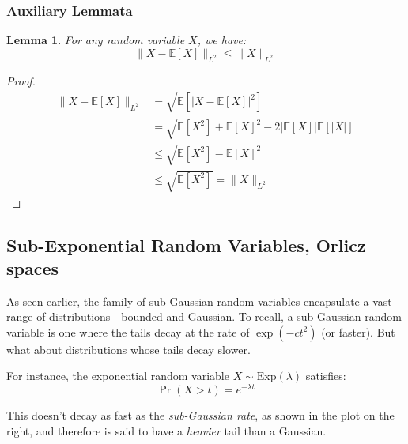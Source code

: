 \documentclass{article}
\newtheorem{lemma}{Lemma}[subsection]
\theoremstyle{remark}
\newcommand{\Exp}{\mathbb{E}}
\begin{document}
\subsubsection{Auxiliary Lemmata}
\begin{lemma}
\label{lem:l2-centering}
For any random variable \(X\), we have:
\begin{equation*}
\|X - \Exp[X]\|_{L^{2}} \leq \|X\|_{L^{2}}
\end{equation*}
\end{lemma}

\begin{proof}
\begin{align*}
\|X - \Exp[X]\|_{L^{2}} &= \sqrt{\Exp[|X - \Exp[X]|^{2}]} \\
&= \sqrt{\Exp[X^{2}] + \Exp[X]^{2} - 2|\Exp[X]|\Exp[|X|]} \\
&\leq \sqrt{\Exp[X^{2}] - \Exp[X]^{2}} \\
&\leq \sqrt{\Exp[X^{2}]} = \|X\|_{L^{2}}
\end{align*}
\end{proof}

\subsection{Sub-Exponential Random Variables, Orlicz spaces}
As seen earlier, the family of sub-Gaussian random variables encapsulate a vast range of distributions - bounded and Gaussian. To recall, a sub-Gaussian random variable is one where the tails decay at the rate of \(\exp(-ct^{2})\) (or faster). But what about distributions whose tails decay slower.

\begin{minipage}{0.29\linewidth}
\end{minipage}
\hfill
\begin{minipage}{0.7\linewidth}
For instance, the exponential random variable \(X \sim \mathrm{Exp}(\lambda)\) satisfies:
\begin{equation*}
\Pr(X > t) = e^{-\lambda t}
\end{equation*}

This doesn't decay as fast as the \emph{sub-Gaussian rate}, as shown in the plot on the right, and therefore is said to have a \emph{heavier} tail than a Gaussian.
\end{minipage}
\end{document}
